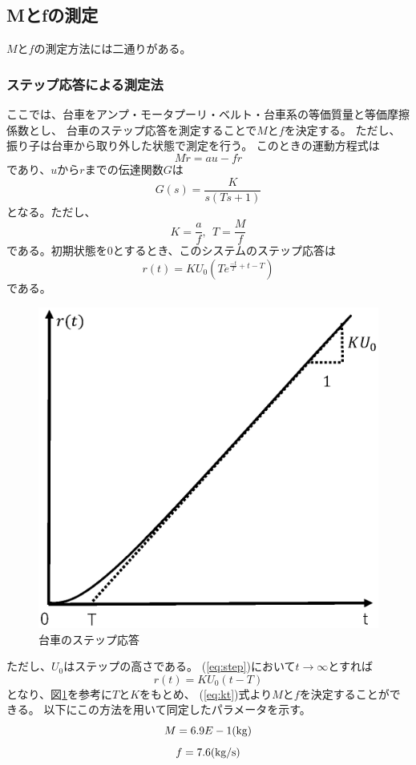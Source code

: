 \subsection{Mとfの測定}
	
	$M$と$f$の測定方法には二通りがある。
	\subsubsection{ステップ応答による測定法}
		ここでは、台車をアンプ・モータプーリ・ベルト・台車系の等価質量と等価摩擦係数とし、
		台車のステップ応答を測定することで$M$と$f$を決定する。
		ただし、振り子は台車から取り外した状態で測定を行う。
		このときの運動方程式は
		\[
			M\ddot{r} = au - f\dot{r}
		\]
		であり、$u$から$r$までの伝達関数$G$は
		\[
			G(s) = \frac{K}{s(Ts+1)}
		\]
		となる。ただし、
		\begin{equation}
			K = \frac{a}{f},\ \ T=\frac{M}{f}
			\label{eq:kt}
		\end{equation}
		である。初期状態を0とするとき、このシステムのステップ応答は
		\begin{equation}
			r(t) = KU_{0}\left(Te^{\frac{-t}{T}+t-T}\right)
			\label{eq:step}
		\end{equation}
		である。
		\begin{figure}[H]
			\centering
			\includegraphics[width=1.0\linewidth]{gazo/step.eps}
			\caption{台車のステップ応答}
			\label{image:parameterMF}
		\end{figure}
		ただし、$U_{0}$はステップの高さである。
		(\ref{eq:step})において$t→\infty$とすれば
		\[
			r(t) = KU_{0}(t-T)
		\]
		となり、図\ref{image:parameterMF}を参考に$T$と$K$をもとめ、
		(\ref{eq:kt})式より$M$と$f$を決定することができる。
		以下にこの方法を用いて同定したパラメータを示す。
		\[
			M=6.9E-1(\rm{kg})
		\]
		\[
			f=7.6(\rm{kg/s})
		\]
		
